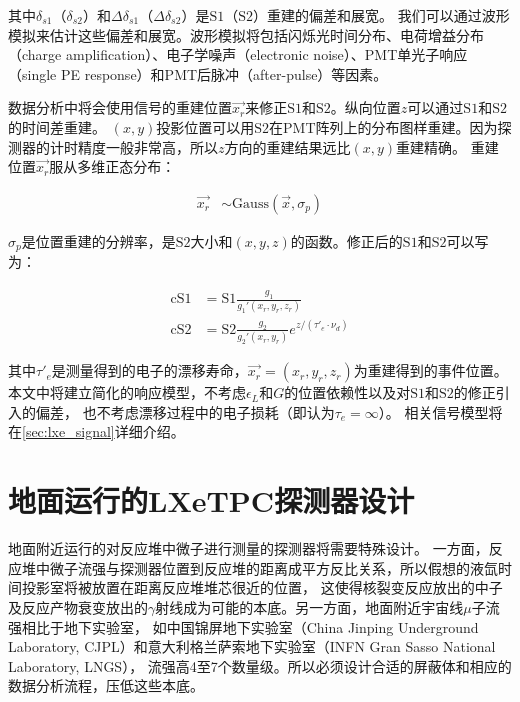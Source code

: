 其中$\delta_{s1}$（$\delta_{s2}$）和$\Delta \delta_{s1}$（$\Delta \delta_{s2}$）是$\mathrm{S1}$（$\mathrm{S2}$）重建的偏差和展宽。
我们可以通过波形模拟来估计这些偏差和展宽。波形模拟将包括闪烁光时间分布、电荷增益分布（charge amplification）、电子学噪声（electronic noise）、PMT单光子响应（single PE response）和PMT后脉冲（after-pulse）等因素。

数据分析中将会使用信号的重建位置$\vec{x_r}$来修正$\mathrm{S1}$和$\mathrm{S2}$。纵向位置$z$可以通过$\mathrm{S1}$和$\mathrm{S2}$的时间差重建。
$(x,y)$投影位置可以用$\mathrm{S2}$在PMT阵列上的分布图样重建。因为探测器的计时精度一般非常高，所以$z$方向的重建结果远比$(x,y)$重建精确。
重建位置$\vec{x_r}$服从多维正态分布：

\begin{align}
    \label{eq:x_r}
    \vec{x_r} &\sim \mathrm{Gauss}\left(\vec{x},\sigma_p\right)
\end{align}

$\sigma_p$是位置重建的分辨率，是$\mathrm{S2}$大小和$(x,y,z)$的函数。修正后的$\mathrm{S1}$和$\mathrm{S2}$可以写为：

\begin{align}
    \label{eq:cs1_cs2}
    \mathrm{cS1} &= \mathrm{S1}\frac{g_1}{g_1'(x_r,y_r,z_r)} \\
    \mathrm{cS2} &= \mathrm{S2}\frac{g_2}{g_2'(x_r,y_r)}e^{z/(\tau'_e\cdot\nu_d)}
\end{align}

其中$\tau'_e$是测量得到的电子的漂移寿命，$\vec{x_r}=(x_r,y_r,z_r)$为重建得到的事件位置。
本文中将建立简化的响应模型，不考虑$\epsilon_L$和$G$的位置依赖性以及对$\mathrm{S1}$和$\mathrm{S2}$的修正引入的偏差，
也不考虑漂移过程中的电子损耗（即认为$\tau_e=\infty$）。
相关信号模型将在\ref{sec:lxe_signal}详细介绍。

\section{地面运行的LXeTPC探测器设计}

地面附近运行的对反应堆中微子进行测量的探测器将需要特殊设计。
一方面，反应堆中微子流强与探测器位置到反应堆的距离成平方反比关系，所以假想的液氙时间投影室将被放置在距离反应堆堆芯很近的位置，
这使得核裂变反应放出的中子及反应产物衰变放出的$\gamma$射线成为可能的本底。另一方面，地面附近宇宙线$\mu$子流强相比于地下实验室，
如中国锦屏地下实验室（China Jinping Underground Laboratory, CJPL）和意大利格兰萨索地下实验室（INFN Gran Sasso National Laboratory, LNGS），
流强高4至7个数量级\cite{guo_muon_2021}。所以必须设计合适的屏蔽体和相应的数据分析流程，压低这些本底。

